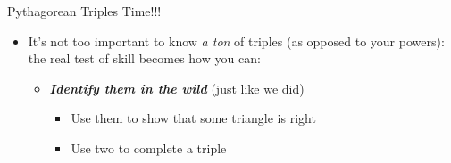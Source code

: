 \documentclass[aspectratio=169,xcolor=dvipsnames]{beamer}
\begin{document}
\begin{frame}[t]{Pythagorean Triples Time!!!}

\begin{itemize}
    \item It's not too important to know \textit{a ton} of triples (as opposed to your powers): the real test of skill becomes how you can:
    \begin{itemize}
        \item \textbf{\textit{Identify them in the wild}} (just like we did)
        \begin{itemize}
            \item Use them to show that some triangle is right
            \item Use two to complete a triple
        \end{itemize}
    \end{itemize}
\end{itemize}




\end{frame}
\end{document}
